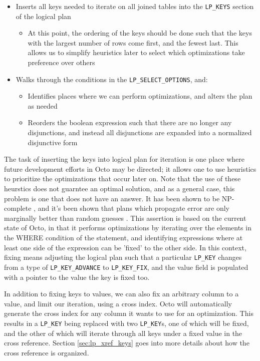 \documentclass[]{article}
\def\code#1{\texttt{#1}}
\begin{document}
\begin{itemize}
	\item Inserts all keys needed to iterate on all joined tables into the \code{LP\_KEYS} section of the logical plan
	\begin{itemize}
		\item At this point, the ordering of the keys should be done such that the keys with the largest number of rows come first, and the fewest last. This allows us to simplify heuristics later to select which optimizations take preference over others
	\end{itemize}
	\item Walks through the conditions in the \code{LP\_SELECT\_OPTIONS}, and:
	\begin{itemize}
		\item Identifies places where we can perform optimizations, and alters the plan as needed
		\item Reorders the boolean expression such that there are no longer any disjunctions, and instead all disjunctions are expanded into a normalized disjunctive form
	\end{itemize}
\end{itemize}

The task of inserting the keys into logical plan for iteration is one place where future development efforts in Octo may be directed; it allows one to use heuristics to prioritize the optimizations that occur later on.
Note that the use of these heurstics does not guarntee an optimal solution, and as a general case, this problem is one that does not have an answer.
It has been shown to be NP-complete \cite{cook_complexity_1971}, and it's been shown that plans which propagate error are only marginally better than random guesses \cite{ioannidis_propagation_1991}.
This assertion is based on the current state of Octo, in that it performs optimizations by iterating over the elements in the WHERE condition of the statement, and identifying expressions where at least one side of the expression can be 'fixed' to the other side.
In this context, fixing means adjusting the logical plan such that a particular \code{LP\_KEY} changes from a type of \code{LP\_KEY\_ADVANCE} to \code{LP\_KEY\_FIX}, and the value field is populated with a pointer to the value the key is fixed too.

In addition to fixing keys to values, we can also fix an arbitrary column to a value, and limit our iteration, using a cross index.
Octo will automatically generate the cross index for any column it wants to use for an optimization.
This results in a \code{LP\_KEY} being replaced with two \code{LP\_KEY}s, one of which will be fixed, and the other of which will iterate through all keys under a fixed value in the cross reference.
Section \ref{sec:lp_xref_keys} goes into more details about how the cross reference is organized.
\end{document}

